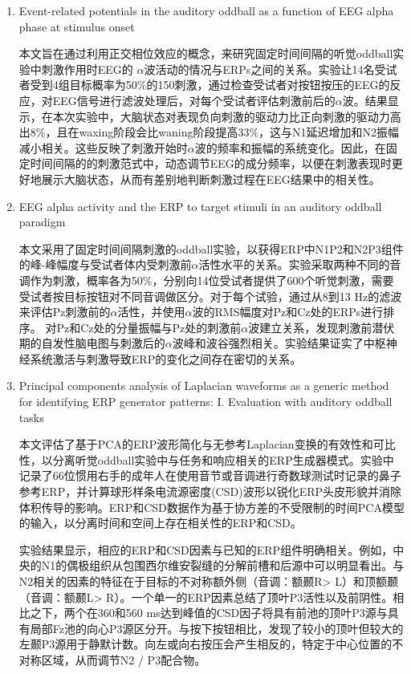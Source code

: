 \documentclass{hitreport}
\begin{document}
\begin{enumerate}
\item Event-related potentials in the auditory oddball as a function of EEG alpha phase at stimulus onset\cite{Barry2004}

\hspace{2em}本文旨在通过利用正交相位效应的概念，来研究固定时间间隔的听觉oddball实验中刺激作用时EEG的 $\alpha$波活动的情况与ERPs之间的关系。实验让14名受试者受到4组目标概率为50\%的150刺激，通过检查受试者对按钮按压的EEG的反应，对EEG信号进行滤波处理后，对每个受试者评估刺激前后的$\alpha$波。结果显示，在本次实验中，大脑状态对表现负向刺激的驱动力比正向刺激的驱动力高出8\%，且在waxing阶段会比waning阶段提高33\%，这与N1延迟增加和N2振幅减小相关。这些反映了刺激开始时$\alpha$波的频率和振幅的系统变化。因此，在固定时间间隔的的刺激范式中，动态调节EEG的成分频率，以便在刺激表现时更好地展示大脑状态，从而有差别地判断刺激过程在EEG结果中的相关性。

\item EEG alpha activity and the ERP to target stimuli in an auditory oddball paradigm\cite{Barry2000}

\hspace{2em}本文采用了固定时间间隔刺激的oddball实验，以获得ERP中N1P2和N2P3组件的峰-峰幅度与受试者体内受刺激前$\alpha$活性水平的关系。实验采取两种不同的音调作为刺激，概率各为50\%，分别向14位受试者提供了600个听觉刺激，需要受试者按目标按钮对不同音调做区分。对于每个试验，通过从8到13 Hz的滤波来评估Pz刺激前的$\alpha$活性，并使用$\alpha$波的RMS幅度对Pz和Cz处的ERPs进行排序。 对Pz和Cz处的分量振幅与Pz处的刺激前$\alpha$波建立关系，发现刺激前潜伏期的自发性脑电图与刺激后的$\alpha$波峰和波谷强烈相关。实验结果证实了中枢神经系统激活与刺激导致ERP的变化之间存在密切的关系。

\item Principal components analysis of Laplacian waveforms as a generic method for identifying ERP generator patterns: I. Evaluation with auditory oddball tasks\cite{Kayser2006}

\hspace{2em}本文评估了基于PCA的ERP波形简化与无参考Laplacian变换的有效性和可比性，以分离听觉oddball实验中与任务和响应相关的ERP生成器模式。实验中记录了66位惯用右手的成年人在使用音节或音调进行奇数球测试时记录的鼻子参考ERP，并计算球形样条电流源密度(CSD)波形以锐化ERP头皮形貌并消除体积传导的影响。ERP和CSD数据作为基于协方差的不受限制的时间PCA模型的输入，以分离时间和空间上存在相关性的ERP和CSD。

\hspace{2em}实验结果显示，相应的ERP和CSD因素与已知的ERP组件明确相关。例如，中央的N1的偶极组织从包围西尔维安裂缝的分解前槽和后源中可以明显看出。与N2相关的因素的特征在于目标的不对称额外侧（音调：额颞R> L）和顶额颞（音调：额颞L> R）。一个单一的ERP因素总结了顶叶P3活性以及前阴性。相比之下，两个在360和560 ms达到峰值的CSD因子将具有前池的顶叶P3源与具有局部Fz池的向心P3源区分开。与按下按钮相比，发现了较小的顶叶但较大的左颞P3源用于静默计数。向左或向右按​​压会产生相反的，特定于中心位置的不对称区域，从而调节N2 / P3配合物。

\end{enumerate}
\end{document}
